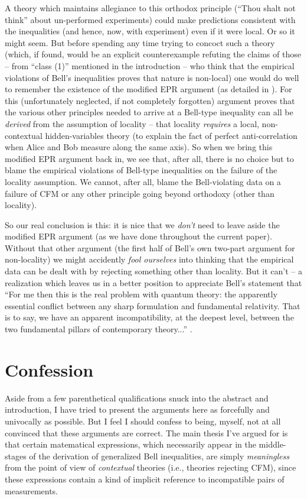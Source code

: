 \documentclass[aps,prc,onecolumn,12pt]{revtex4-2}
\begin{document}
A theory which maintains allegiance to this orthodox principle (``Thou
shalt not think'' about un-performed experiments) could make
predictions consistent with the inequalities (and hence, now, with
experiment) even if it were local.  Or so it might seem.  But before
spending any time trying to concoct such a theory (which, if found,
would be an explicit counterexample refuting the claims of those -- from
``class (1)'' mentioned in the introduction -- who think that the
empirical violations of Bell's inequalities proves that nature is non-local)
one would do well to remember the existence of the modified EPR
argument (as detailed in \cite{nonlocchar}).  For this (unfortunately
neglected, if not completely forgotten) argument proves that the
various other principles needed to arrive at a Bell-type inequality can
all be \emph{derived} from the assumption of locality -- that locality
\emph{requires} a local, non-contextual hidden-variables theory (to
explain the fact of perfect anti-correlation when Alice and Bob measure
along the same axis).  So when we bring this modified EPR argument
back in, we see that, after all, there is no choice but to blame the
empirical violations of Bell-type inequalities on the failure of the
locality assumption.  We cannot, after all, blame the Bell-violating
data on a failure of CFM or any other principle going beyond
orthodoxy (other than locality).

So our real conclusion is this:
it is nice that we \emph{don't} need to leave aside the
modified EPR argument (as we have done throughout the current paper).
Without that other argument (the first half of Bell's own two-part
argument for non-locality) we might accidently \emph{fool ourselves}
into thinking that the empirical data can be dealt with by rejecting
something other than locality.  But it can't -- a realization
which leaves us in a better position
to appreciate Bell's statement that ``For me then this is
the real problem with quantum theory:  the apparently essential
conflict between any sharp formulation and fundamental relativity.
That is to say, we have an apparent incompatibility, at the deepest
level, between the two fundamental pillars of contemporary theory...''
\cite[pg 172]{bell}.


\section{Confession}

Aside from a few parenthetical qualifications snuck into the abstract
and introduction, I have tried to present the arguments here as
forcefully and univocally as possible.  But I feel I should confess to
being, myself, not at all convinced that these arguments are
correct.  The main thesis I've argued for is that certain matematical
expressions, which necessarily appear in the middle-stages of the
derivation of generalized Bell inequalities, are simply
\emph{meaningless} from the point of view of \emph{contextual}
theories (i.e., theories rejecting CFM), since these expressions
contain a kind of implicit reference to incompatible pairs of
measurements.
\end{document}
